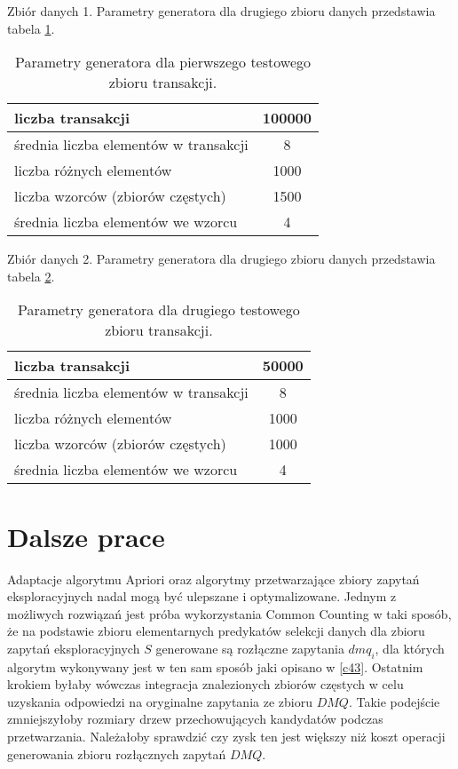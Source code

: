 Zbiór danych 1.\newline
Parametry generatora dla drugiego zbioru danych przedstawia tabela \ref{table:firstDataSetParams}.
\begin{table}[h]
\begin{center}
	\begin{tabular}{| l | c |}
		\hline
		liczba transakcji & 100000 \\ \hline
		średnia liczba elementów w transakcji & 8 \\ \hline
		liczba różnych elementów & 1000 \\ \hline
		liczba wzorców (zbiorów częstych) & 1500 \\ \hline
		średnia liczba elementów we wzorcu & 4 \\ 
		\hline
	\end{tabular}
\end{center}
\caption{Parametry generatora dla pierwszego testowego zbioru transakcji.}
\label{table:firstDataSetParams}
\end{table}

Zbiór danych 2.\newline
Parametry generatora dla drugiego zbioru danych przedstawia tabela \ref{table:secondDataSetParams}.
\begin{table}[h]
	\begin{center}
		\begin{tabular}{| l | c |}
			\hline
			liczba transakcji & 50000 \\ \hline
			średnia liczba elementów w transakcji & 8 \\ \hline
			liczba różnych elementów & 1000 \\ \hline
			liczba wzorców (zbiorów częstych) & 1000 \\ \hline
			średnia liczba elementów we wzorcu & 4 \\ 
			\hline
		\end{tabular}
	\end{center}
	\caption{Parametry generatora dla drugiego testowego zbioru transakcji.}
	\label{table:secondDataSetParams}
\end{table}

\section{Dalsze prace}
\label{c54}
Adaptacje algorytmu Apriori oraz algorytmy przetwarzające zbiory zapytań eksploracyjnych nadal mogą być ulepszane i optymalizowane. Jednym z możliwych rozwiązań jest próba wykorzystania Common Counting w taki sposób, że na podstawie zbioru elementarnych predykatów selekcji danych dla zbioru zapytań eksploracyjnych \(S\) generowane są rozłączne zapytania \(dmq_i\), dla których algorytm wykonywany jest w ten sam sposób jaki opisano w \ref{c43}. Ostatnim krokiem byłaby wówczas integracja znalezionych zbiorów częstych w celu uzyskania odpowiedzi na oryginalne zapytania ze zbioru \(DMQ\). Takie podejście zmniejszyłoby rozmiary drzew przechowujących kandydatów podczas przetwarzania. Należałoby sprawdzić czy zysk ten jest większy niż koszt operacji generowania zbioru rozłącznych zapytań \(DMQ\). 

